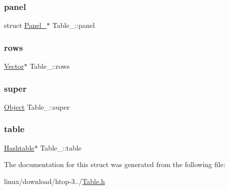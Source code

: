 \mbox{\label{structTable___a6e8cbffb4956be9a2e161764ade6eb11}} 
\subsubsection{\texorpdfstring{panel}{panel}}
{\footnotesize\ttfamily struct \hyperlink{structPanel__}{Panel\+\_\+}$\ast$ Table\+\_\+\+::panel}

\mbox{\label{structTable___ac293af9f357693e9c57a156d115591df}} 
\subsubsection{\texorpdfstring{rows}{rows}}
{\footnotesize\ttfamily \hyperlink{Vector_8h_a8297b82ce917cd21838596b7e3a7faa8}{Vector}$\ast$ Table\+\_\+\+::rows}

\mbox{\label{structTable___a74fd40edc0f1a4120871c2e0d84372ac}} 
\subsubsection{\texorpdfstring{super}{super}}
{\footnotesize\ttfamily \hyperlink{Object_8h_a32b67ad7134cd31b5ec5ed9c6a2d3978}{Object} Table\+\_\+\+::super}

\mbox{\label{structTable___a640077da3b4571814a69890d7601b5fd}} 
\subsubsection{\texorpdfstring{table}{table}}
{\footnotesize\ttfamily \hyperlink{Hashtable_8h_af67f943dab16c5d7d465c18053edf47f}{Hashtable}$\ast$ Table\+\_\+\+::table}



The documentation for this struct was generated from the following file\+:\begin{DoxyCompactItemize}
\item 
linux/download/htop-\/3../\hyperlink{Table_8h}{Table.\+h}\end{DoxyCompactItemize}
